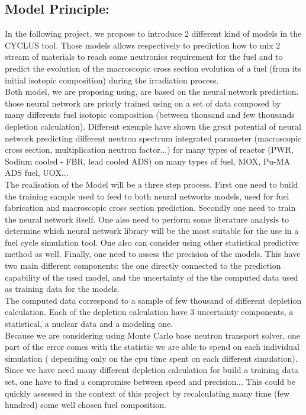 \documentclass[dvips,12pt]{article}
\begin{document}
\subsection{Model Principle:}
In the following project, we propose to introduce 2 different kind of models in the CYCLUS tool. Those models allows respectively to prediction how to mix 2 stream of materials to reach some neutronics requirement for the fuel and to predict the evolution of the macroscopic cross section evolution of a fuel (from its initial isotopic composition) during the irradiation process.\\
Both model, we are proposing using, are based on the neural network prediction. those neural network are priorly trained using on a set of data composed by many differents fuel isotopic composition (between thousand and few thousands depletion calculation). Different exemple have shown the great potential of neural network predicting different neutron spectrum integrated parameter (macroscopic cross section, multiplication neutron factor...) for many types of reactor (PWR, Sodium cooled - FBR,  lead cooled ADS) on many types of fuel, MOX, Pu-MA ADS fuel, UOX...\\
The realisation of the Model will be a three step process. First one need to build the training sample used to feed to both neural networks models, used for fuel fabrication and macroscopic cross section prediction.  Secondly one need to train the neural network itself. One also need to perform some literature analysis to determine which neural network library will be the most suitable for the use in a fuel cycle simulation tool. One also can consider using other statistical predictive method as well.
Finally, one need to assess the precision of the models. This have two main different components: the one directly connected to the prediction capability of the used model, and the uncertainty of the the computed data used as training data for the models.\\
The computed data correspond to a sample of few thousand of different depletion calculation. Each of the depletion calculation have 3 uncertainty components, a statistical, a nuclear data and a modeling one. \\
Because we are considering using Monte Carlo base neutron transport solver, one part of the error comes with the statistic we are able to spend on each individual simulation ( depending only on the cpu time spent on each different simulation). Since we have need many different depletion calculation for build a training data set, one have to find a compromise between speed and precision... This could be quickly assessed in the context of this project by recalculating many time (few hundred) some well chosen fuel composition.\\
\end{document}

